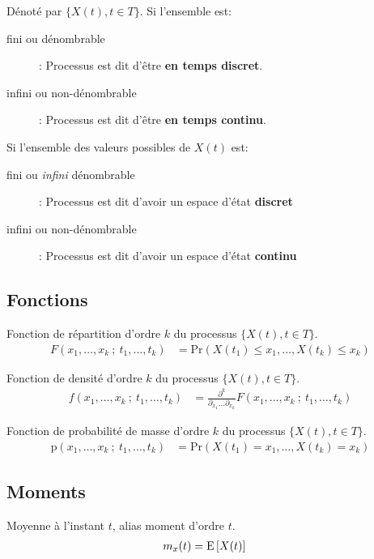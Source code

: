 \documentclass[10pt, french, landscape]{article}
\begin{document}
\begin{multicols*}{2}
Dénoté par $\{X(t), t \in T\}$.
Si l'ensemble est:
\begin{description}
	\item[fini ou dénombrable]: Processus est dit d'être \textbf{en temps discret}.
	\item[infini ou non-dénombrable]: Processus est dit d'être \textbf{en temps continu}.
\end{description}

Si l'ensemble des valeurs possibles de $X(t)$ est:
\begin{description}
	\item[fini ou \textit{infini} dénombrable]: Processus est dit d'avoir un espace d'état \textbf{discret}
	\item[infini ou non-dénombrable]: Processus est dit d'avoir un espace d'état \textbf{continu}
\end{description}

\subsection*{Fonctions}

Fonction de répartition d'ordre $k$ du processus $\{X(t), t \in T\}$.
	\begin{align*}
		F(x_{1}, \dots, x_{k} \ ; \ t_{1}, \dots, t_{k}) &= \text{Pr}(X(t_{1}) \le x_{1}, \dots, X(t_{k}) \le x_{k})
	\end{align*}
	
Fonction de densité d'ordre $k$ du processus $\{X(t), t \in T\}$.
	\begin{align*}
		f(x_{1}, \dots, x_{k} \ ; \ t_{1}, \dots, t_{k}) &= \frac{\partial^{k}}{\partial_{x_{1}} \dots \partial_{x_{k}}} F(x_{1}, \dots, x_{k} \ ; \ t_{1}, \dots, t_{k})
	\end{align*}

Fonction de probabilité de masse d'ordre $k$ du processus $\{X(t), t \in T\}$.
	\begin{align*}
		\text{p}(x_{1}, \dots, x_{k} \ ; \ t_{1}, \dots, t_{k}) &= \text{Pr}(X(t_{1}) = x_{1}, \dots, X(t_{k}) = x_{k})
	\end{align*}
	
\subsection*{Moments}

Moyenne à l'instant $t$, alias moment d'ordre $t$.
\begin{align*}
	m_{x}(t) &= \mathrm{E} \left[ X(t) \right]
\end{align*}


\end{multicols*}
\end{document}
